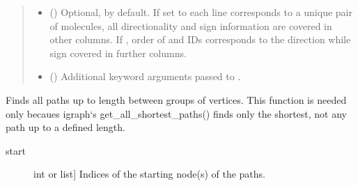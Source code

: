 \documentclass[letterpaper,10pt,english]{sphinxmanual}
\begin{document}
\begin{fulllineitems}
\begin{fulllineitems}
\begin{quote}
\begin{description}
\begin{itemize}
\item {} 
 () \textendash{} Optional,  by default. If set to  each line
corresponds to a unique pair of molecules, all
directionality and sign information are covered in other
columns. If , order of  and  IDs
corresponds to the direction while sign covered in further
columns.

\item {} 
 (\sphinxstyleliteralemphasis{\sphinxupquote{**}}) \textendash{} Additional keyword arguments passed to
.

\end{itemize}

\end{description}\end{quote}

\end{fulllineitems}


\begin{fulllineitems}
\label{\detokenize{reference:pypath.main.PyPath.filters}}
\end{fulllineitems}


\begin{fulllineitems}
\label{\detokenize{reference:pypath.main.PyPath.find_all_paths}}
Finds all paths up to length  between groups of
vertices. This function is needed only becaues igraph{}`s
get\_all\_shortest\_paths() finds only the shortest, not any
path up to a defined length.
\begin{description}
\item[{start}] \leavevmode{[}int or list{]}
Indices of the starting node(s) of the paths.


\end{description}
\end{fulllineitems}
\end{fulllineitems}
\end{document}
